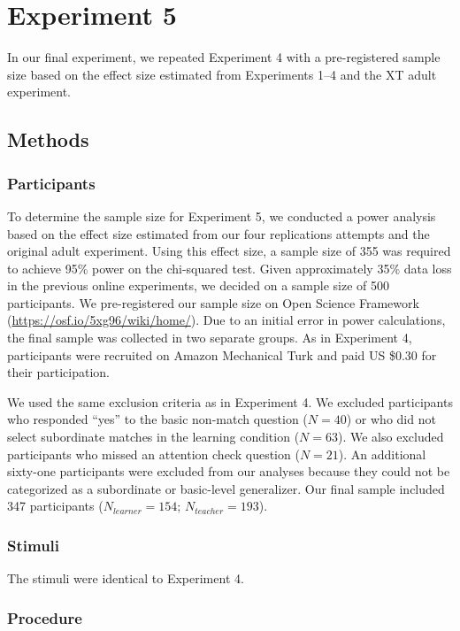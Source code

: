 \documentclass[man]{apa2}
\begin{document}
\section{Experiment 5}

In our final experiment, we repeated Experiment 4 with a pre-registered sample size based on the effect size estimated from Experiments 1--4 and the XT adult experiment. 

\subsection{Methods}

\subsubsection{Participants}  

To determine the sample size for Experiment 5, we conducted a power analysis based on the effect size estimated from our four replications attempts and the original adult experiment. Using this  effect size, a sample size of 355 was required to  achieve 95\% power on the chi-squared test. Given approximately 35\% data loss in the previous online experiments, we decided on a sample size of 500 participants. We pre-registered our sample size on Open Science Framework (\url{https://osf.io/5xg96/wiki/home/}). Due to an initial error in power calculations, the final sample was collected in two separate groups. As in Experiment 4, participants were recruited on Amazon Mechanical Turk and  paid US \$0.30 for their participation. 

We used the same exclusion criteria as in Experiment 4. We excluded participants who responded ``yes'' to the basic non-match question ($N=40$) or who did not select subordinate matches in the learning condition ($N = 63$). We also excluded participants who missed an attention check question ($N = 21$). An additional sixty-one participants were excluded from our analyses because they could not be categorized as a subordinate or basic-level generalizer. Our final sample included 347 participants ($N_{learner} = 154$; $N_{teacher} = 193$). 

\subsubsection{Stimuli}

The stimuli were identical to Experiment 4.

\subsubsection{Procedure}
\end{document}
